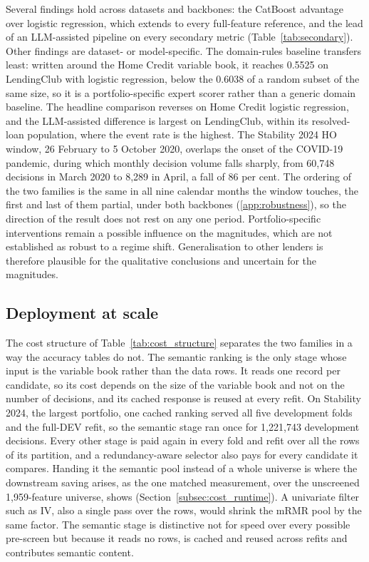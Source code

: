 \documentclass[final,5p,twocolumn]{elsarticle}
\begin{document}
Several findings hold across datasets and backbones: the CatBoost advantage over logistic regression, which extends to every full-feature reference, and the lead of an LLM-assisted pipeline on every secondary metric (Table~\ref{tab:secondary}). Other findings are dataset- or model-specific. The domain-rules baseline transfers least: written around the Home Credit variable book, it reaches 0.5525 on LendingClub with logistic regression, below the 0.6038 of a random subset of the same size, so it is a portfolio-specific expert scorer rather than a generic domain baseline. The headline comparison reverses on Home Credit logistic regression, and the LLM-assisted difference is largest on LendingClub, within its resolved-loan population, where the event rate is the highest. The Stability 2024 HO window, 26 February to 5 October 2020, overlaps the onset of the COVID-19 pandemic, during which monthly decision volume falls sharply, from 60,748 decisions in March 2020 to 8,289 in April, a fall of 86 per cent.
The ordering of the two families is the same in all nine calendar months the window touches, the first and last of them partial, under both backbones (\ref{app:robustness}), so the direction of the result does not rest on any one period. Portfolio-specific interventions remain a possible influence on the magnitudes, which are not established as robust to a regime shift. Generalisation to other lenders is therefore plausible for the qualitative conclusions and uncertain for the magnitudes.

\subsection{Deployment at scale}
\label{subsec:deployment_scale}

The cost structure of Table~\ref{tab:cost_structure} separates the two families in a way the accuracy tables do not. The semantic ranking is the only stage whose input is the variable book rather than the data rows. It reads one record per candidate, so its cost depends on the size of the variable book and not on the number of decisions, and its cached response is reused at every refit. On Stability 2024, the largest portfolio, one cached ranking served all five development folds and the full-DEV refit, so the semantic stage ran once for 1,221,743 development decisions. Every other stage is paid again in every fold and refit over all the rows of its partition, and a redundancy-aware selector also pays for every candidate it compares. Handing it the semantic pool instead of a whole universe is where the downstream saving arises, as the one matched measurement, over the unscreened 1,959-feature universe, shows (Section~\ref{subsec:cost_runtime}). A univariate filter such as IV, also a single pass over the rows, would shrink the mRMR pool by the same factor. The semantic stage is distinctive not for speed over every possible pre-screen but because it reads no rows, is cached and reused across refits and contributes semantic content.
\end{document}
